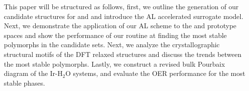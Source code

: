 
%
%
This paper will be structured as follows,
first, we outline the generation of our candidate structures for \IrOtwo and \IrOthree and introduce the AL accelerated surrogate model.
%
Next, we demonstrate the application of our AL scheme to the \IrOtwo and \IrOthree prototype spaces and show the performance of our routine at finding the most stable polymorphs in the candidate sets.
%
Next, we analyze the crystallographic structural motifs of the DFT relaxed structures and discuss the trends between the most stable polymorphs.
%
Lastly, we construct a revised bulk Pourbaix diagram of the Ir-H$_2$O systems, and evaluate the OER performance for the most stable phases.
%
